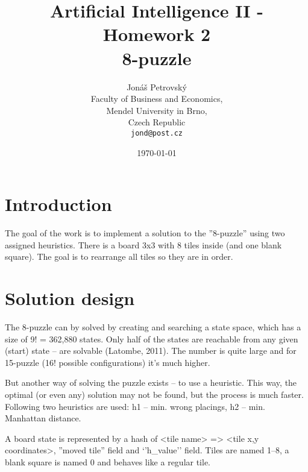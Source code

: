 \documentclass{article}
\begin{document}
\title{Artificial Intelligence II - Homework 2 \\ 8-puzzle}
\author{Jonáš Petrovský\\
        Faculty of Business and Economics,\\
		Mendel University in Brno,\\
		Czech Republic \\
		\texttt{jond@post.cz}}
\date{\today}
\maketitle

\section{Introduction}
The goal of the work is to implement a solution to the ''8-puzzle'' using two assigned heuristics. There is a board 3x3 with 8 tiles inside (and one blank square). The goal is to rearrange all tiles so they are in order. 

\section{Solution design}
The 8-puzzle can by solved by creating and searching a state space, which has a size of 9! = 362,880 states. Only half of the states are reachable from any given (start) state -- are solvable (Latombe, 2011). The number is quite large and for 15-puzzle (16! possible configurations) it's much higher. 

But another way of solving the puzzle exists -- to use a heuristic. This way, the optimal (or even any) solution may not be found, but the process is much faster. Following two heuristics are used: h1 -- min. wrong placings, h2 -- min. Manhattan distance.

A board state is represented by a hash of <tile name> => <tile x,y coordinates>, ''moved tile'' field and `'h\_value'' field. Tiles are named 1--8, a blank square is named 0 and behaves like a regular tile. 
\end{document}
